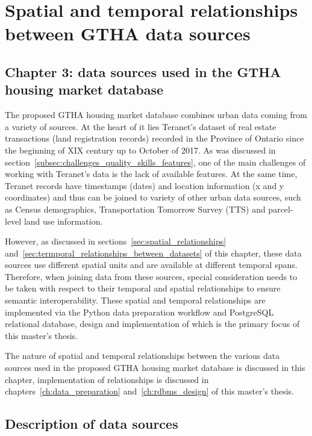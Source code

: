 \chapter{Spatial and temporal relationships between GTHA data sources} \label{ch:spatial_and_temporal_relationships_between_urban_data}

\section{Chapter 3: data sources used in the GTHA housing market database} \label{sec:chapter_3_intro}

The proposed GTHA housing market database combines urban data coming from a variety of sources.
At the heart of it lies Teranet's dataset of real estate transactions (land registration records) recorded in the Province of Ontario since the beginning of XIX century up to October of 2017.
As was discussed in section~\ref{subsec:challenges_quality_skills_features}, one of the main challenges of working with Teranet's data is the lack of available features.
At the same time, Teranet records have timestamps (dates) and location information (x and y coordinates) and thus can be joined to variety of other urban data sources, such as Census demographics, Transportation Tomorrow Survey (TTS) and parcel-level land use information.

However, as discussed in sections~\ref{sec:spatial_relationships} and~\ref{sec:termporal_relationships_between_datasets} of this chapter, these data sources use different spatial units and are available at different temporal spans.
Therefore, when joining data from these sources, special consideration needs to be taken with respect to their temporal and spatial relationships to ensure semantic interoperability.
These spatial and temporal relationships are implemented via the Python data preparation workflow and PostgreSQL relational database, design and implementation of which is the primary focus of this master's thesis.

The nature of spatial and temporal relationships between the various data sources used in the proposed GTHA housing market database is discussed in this chapter, implementation of relationships is discussed in chapters~\ref{ch:data_preparation} and~\ref{ch:rdbms_design} of this master's thesis.

\section{Description of data sources} \label{sec:description_of_data_sources}

